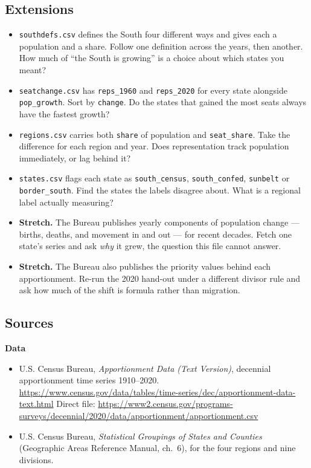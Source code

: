\documentclass[
]{article}
\providecommand{\tightlist}{%
  \setlength{\itemsep}{0pt}\setlength{\parskip}{0pt}}
\begin{document}
\subsection{Extensions}\label{extensions}

\begin{itemize}
\tightlist
\item
  \texttt{southdefs.csv} defines the South four different ways and gives
  each a population and a share. Follow one definition across the years,
  then another. How much of ``the South is growing'' is a choice about
  which states you meant?
\item
  \texttt{seatchange.csv} has \texttt{reps\_1960} and
  \texttt{reps\_2020} for every state alongside \texttt{pop\_growth}.
  Sort by \texttt{change}. Do the states that gained the most seats
  always have the fastest growth?
\item
  \texttt{regions.csv} carries both \texttt{share} of population and
  \texttt{seat\_share}. Take the difference for each region and year.
  Does representation track population immediately, or lag behind it?
\item
  \texttt{states.csv} flags each state as \texttt{south\_census},
  \texttt{south\_confed}, \texttt{sunbelt} or \texttt{border\_south}.
  Find the states the labels disagree about. What is a regional label
  actually measuring?
\item
  \textbf{Stretch.} The Bureau publishes yearly components of population
  change --- births, deaths, and movement in and out --- for recent
  decades. Fetch one state's series and ask \emph{why} it grew, the
  question this file cannot answer.
\item
  \textbf{Stretch.} The Bureau also publishes the priority values behind
  each apportionment. Re-run the 2020 hand-out under a different divisor
  rule and ask how much of the shift is formula rather than migration.
\end{itemize}

\subsection{Sources}\label{sources}

\textbf{Data}

\begin{itemize}
\tightlist
\item
  U.S. Census Bureau, \emph{Apportionment Data (Text Version)},
  decennial apportionment time series 1910--2020.
  \url{https://www.census.gov/data/tables/time-series/dec/apportionment-data-text.html}
  Direct file:
  \url{https://www2.census.gov/programs-surveys/decennial/2020/data/apportionment/apportionment.csv}
\item
  U.S. Census Bureau, \emph{Statistical Groupings of States and
  Counties} (Geographic Areas Reference Manual, ch.~6), for the four
  regions and nine divisions.
\end{itemize}
\end{document}
